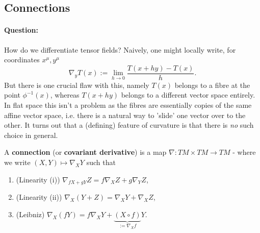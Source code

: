 \documentclass[11pt,fleqn]{report}
\begin{document}
\subsection{Connections}
\paragraph{Question:} How do we differentiate tensor fields? Naively, one might locally write, for coordinates $x^\mu, y^\mu$\begin{equation}
\nabla_yT(x) := \lim_{h\to 0} \frac{T(x+hy)-T(x)}{h}.
\end{equation}
But there is one crucial flaw with this, namely $T(x)$ belongs to a fibre at the point $\phi^{-1}(x)$, whereas $T(x+hy)$ belongs to a different vector space entirely. In flat space this isn't a problem as the fibres are essentially copies of the same affine vector space, i.e. there is a natural way to 'slide' one vector over to the other. It turns out that a (defining) feature of curvature is that there is \textit{no} such choice in general.

\begin{definition}
A \textbf{connection} (or \textbf{covariant derivative}) is a map $\nabla: TM \times TM \to TM$ - where we write $(X,Y) \mapsto \nabla_XY$ such that \begin{enumerate}
\item (Linearity (i)) $\nabla_{fX+gY}Z = f\nabla_XZ+g\nabla_YZ$,
\item (Linearity (ii)) $\nabla_X(Y+Z) = \nabla_XY + \nabla_XZ$,
\item (Leibniz) $\nabla_X(fY)=f\nabla_XY+\underbrace{(X\circ f)}_{:=\nabla_Xf}Y$.
\end{enumerate}
\end{definition}
\end{document}
